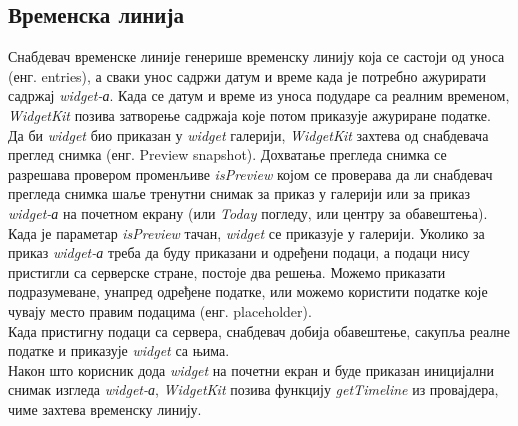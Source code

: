 \documentclass[12pt,oneside]{memoir}
\begin{document}
\subsection{Временска линија}
\label{subsec:Временска линија}
\indent Снабдевач временске линије генерише временску линију која се састоји од уноса (енг. entries), а сваки унос садржи датум и време када је потребно ажурирати садржај \textit{widget-а}. Када се датум и време из уноса подударе са реалним временом, \textit{WidgetKit} позива затворење садржаја које потом приказује ажуриране податке. 
\\
\indent Да би \textit{widget} био приказан у \textit{widget} галерији, \textit{WidgetKit} захтева од снабдевача преглед снимка (енг. Preview snapshot). Дохватање прегледа снимка се разрешава провером променљиве \textit{isPreview} којом се проверава да ли снабдевач прегледа снимка шаље тренутни снимак за приказ у галерији или за приказ \textit{widget-а} на почетном екрану (или \textit{Today} погледу, или центру за обавештења). Када је параметар \textit{isPreview} тачан, \textit{widget} се приказује у галерији. Уколико за приказ \textit{widget-а} треба да буду приказани и одређени подаци, а подаци нису пристигли са серверске стране, постоје два решења. Можемо приказати подразумеване, унапред одређене податке, или можемо користити податке које чувају место правим подацима (енг. placeholder). 
\\
\indent Када пристигну подаци са сервера, снабдевач добија обавештење, сакупља реалне податке и приказује \textit{widget} са њима.
\\
\indent Након што корисник дода \textit{widget} на почетни екран и буде приказан иницијални снимак изгледа \textit{widget-а}, \textit{WidgetKit} позива функцију \textit{getTimeline} из провајдера, чиме захтева временску линију.
\end{document}
